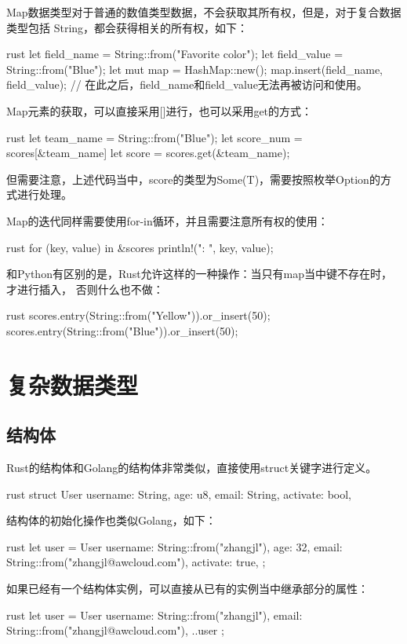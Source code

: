 Map数据类型对于普通的数值类型数据，不会获取其所有权，但是，对于复合数据类型包括
String，都会获得相关的所有权，如下：
\begin{code-block}{rust}
let field_name = String::from("Favorite color");
let field_value = String::from("Blue");
let mut map = HashMap::new();
map.insert(field_name, field_value);
// 在此之后，field_name和field_value无法再被访问和使用。
\end{code-block}

Map元素的获取，可以直接采用[]进行，也可以采用get的方式：
\begin{code-block}{rust}
let team_name = String::from("Blue");
let score_num = scores[&team_name]
let score = scores.get(&team_name);
\end{code-block}
但需要注意，上述代码当中，score的类型为Some(T)，需要按照枚举Option的方式进行处理。

Map的迭代同样需要使用for-in循环，并且需要注意所有权的使用：
\begin{code-block}{rust}
for (key, value) in &scores {
    println!("{}: {}", key, value);
}
\end{code-block}

和Python有区别的是，Rust允许这样的一种操作：当只有map当中键不存在时，才进行插入，
否则什么也不做：
\begin{code-block}{rust}
scores.entry(String::from("Yellow")).or_insert(50);
scores.entry(String::from("Blue")).or_insert(50);
\end{code-block}

\section{复杂数据类型}
\subsection{结构体}
Rust的结构体和Golang的结构体非常类似，直接使用struct关键字进行定义。
\begin{code-block}{rust}
struct User {
    username: String,
    age: u8,
    email: String,
    activate: bool,
}
\end{code-block}
结构体的初始化操作也类似Golang，如下：
\begin{code-block}{rust}
let user = User {
    username: String::from("zhangjl"),
    age: 32,
    email: String::from("zhangjl@awcloud.com"),
    activate: true,
};
\end{code-block}
如果已经有一个结构体实例，可以直接从已有的实例当中继承部分的属性：
\begin{code-block}{rust}
let user = User {
    username: String::from("zhangjl"),
    email: String::from("zhangjl@awcloud.com"),
    ..user
};
\end{code-block}

